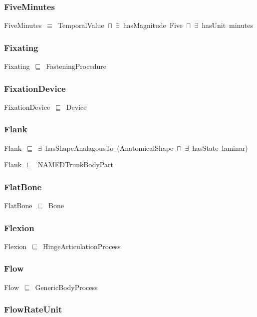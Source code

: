 \documentclass{article}
\begin{document}
\subsubsection*{FiveMinutes}

FiveMinutes~\ensuremath{\equiv}~TemporalValue~\ensuremath{\sqcap}~\ensuremath{\exists}~hasMagnitude~Five~\ensuremath{\sqcap}~\ensuremath{\exists}~hasUnit~minutes

\subsubsection*{Fixating}

Fixating~\ensuremath{\sqsubseteq}~FasteningProcedure~

\subsubsection*{FixationDevice}

FixationDevice~\ensuremath{\sqsubseteq}~Device~

\subsubsection*{Flank}

Flank~\ensuremath{\sqsubseteq}~\ensuremath{\exists}~hasShapeAnalagousTo~(AnatomicalShape~\ensuremath{\sqcap}~\ensuremath{\exists}~hasState~laminar)~

Flank~\ensuremath{\sqsubseteq}~NAMEDTrunkBodyPart~

\subsubsection*{FlatBone}

FlatBone~\ensuremath{\sqsubseteq}~Bone~

\subsubsection*{Flexion}

Flexion~\ensuremath{\sqsubseteq}~HingeArticulationProcess~

\subsubsection*{Flow}

Flow~\ensuremath{\sqsubseteq}~GenericBodyProcess~

\subsubsection*{FlowRateUnit}
\end{document}
